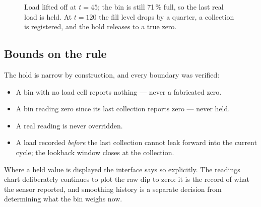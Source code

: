 \documentclass[11pt,a4paper]{article}
\begin{document}
\begin{figure}[h]
\centering
{}
\caption{Load lifted off at $t=45$; the bin is still 71\,\% full, so the
last real load is held. At $t=120$ the fill level drops by a quarter, a
collection is registered, and the hold releases to a true zero.}
\end{figure}

\subsection{Bounds on the rule}

The hold is narrow by construction, and every boundary was verified:

\begin{itemize}
  \item A bin with no load cell reports nothing --- never a fabricated zero.
  \item A bin reading zero since its last collection reports zero --- never held.
  \item A real reading is never overridden.
  \item A load recorded \emph{before} the last collection cannot leak forward
        into the current cycle; the lookback window closes at the collection.
\end{itemize}

Where a held value is displayed the interface says so explicitly. The
readings chart deliberately continues to plot the raw dip to zero: it is
the record of what the sensor reported, and smoothing history is a
separate decision from determining what the bin weighs now.
\end{document}

